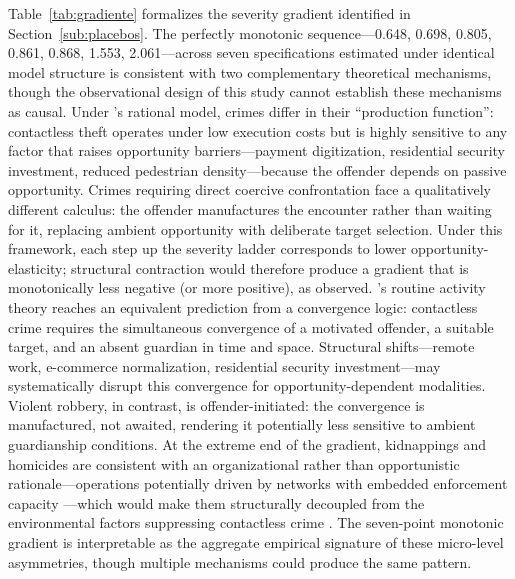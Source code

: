 \documentclass[pdflatex,sn-basic]{sn-jnl}
\begin{document}
Table~\ref{tab:gradiente} formalizes the severity gradient identified in Section~\ref{sub:placebos}. The perfectly monotonic sequence---0.648, 0.698, 0.805, 0.861, 0.868, 1.553, 2.061---across seven specifications estimated under identical model structure is consistent with two complementary theoretical mechanisms, though the observational design of this study cannot establish these mechanisms as causal. Under \citet{becker1968}'s rational model, crimes differ in their ``production function'': contactless theft operates under low execution costs but is highly sensitive to any factor that raises opportunity barriers---payment digitization, residential security investment, reduced pedestrian density---because the offender depends on passive opportunity. Crimes requiring direct coercive confrontation face a qualitatively different calculus: the offender manufactures the encounter rather than waiting for it, replacing ambient opportunity with deliberate target selection. Under this framework, each step up the severity ladder corresponds to lower opportunity-elasticity; structural contraction would therefore produce a gradient that is monotonically less negative (or more positive), as observed. \citet{cohen1979}'s routine activity theory reaches an equivalent prediction from a convergence logic: contactless crime requires the simultaneous convergence of a motivated offender, a suitable target, and an absent guardian in time and space. Structural shifts---remote work, e-commerce normalization, residential security investment---may systematically disrupt this convergence for opportunity-dependent modalities. Violent robbery, in contrast, is offender-initiated: the convergence is manufactured, not awaited, rendering it potentially less sensitive to ambient guardianship conditions. At the extreme end of the gradient, kidnappings and homicides are consistent with an organizational rather than opportunistic rationale---operations potentially driven by networks with embedded enforcement capacity \citep{dammert2025,greene2023}---which would make them structurally decoupled from the environmental factors suppressing contactless crime \citep[see also][for evidence of crime persistence via lagged effects across offense types]{buonanno2008}. The seven-point monotonic gradient is interpretable as the aggregate empirical signature of these micro-level asymmetries, though multiple mechanisms could produce the same pattern.
\end{document}
